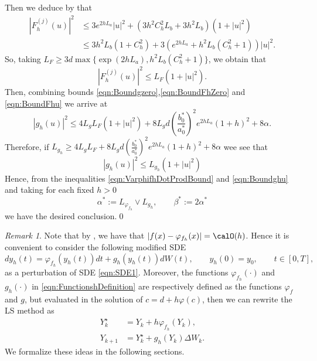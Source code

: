 \documentclass[3p]{elsarticle}
\theoremstyle{definition}
\theoremstyle{plain}%
\theoremstyle{remark}
\newtheorem{remark}{Remark}[section]
\newcommand{\SM}{LS\xspace}
\begin{document}
\begin{pf}
\begin{dmath*}
	\end{dmath*}
	Then we deduce by  that
	\begin{align*}
		|F_h^{(j)}(u)|^2 
		&\leq
			3 e^{2h L_a }|u|^2 + (3 h^2 C_h^2 L_b + 3h^ 2L_b) (1+|u|^2) \\
		&\leq
			3 h^2 L_b (1 + C_h^2)   +
			3 \left(
				 e^{2 h L_a} + h^2 L_b (C_h^2 + 1 ) 
			\right)|u|^2.	
	\end{align*}
	So, taking 
	$
		L_F\geq 3 d \max\{ \exp(2h L_a),  h^2 L_b(C_h^2+1)\}
	$,
	we obtain that
	\begin{equation}\label{eqn:BoundFhu}
		|F_h^{(j)}(u)|^2
		\leq
			L_F(1+|u|^2).	
	\end{equation}
	Then, combining bounds \eqref{eqn:Boundgzero},\eqref{eqn:BoundFhZero} and \eqref{eqn:BoundFhu} we arrive at
	\begin{equation*}
		|g_h(u)|^2 \leq
			4 L_g L_F(1+|u|^2)
			+ 8 L_g d
			\left(
				\frac{b_0^*}{a_0^*}
			\right)^2
			e^{2h L_a} (1+h)^2
			+8 \alpha.
	\end{equation*}
	Therefore, if
	$
		 L_{g_h} 
		 \geq 
			  4 L_g L_F + 8 L_g d
			  \left(
				  \frac{b_0^*}{a_0^*}
			  \right)^2
			  e^{2h L_a} (1+h)^2
			  +8 \alpha		  
	$
	wee see that
	\begin{equation}\label{eqn:Boundghu}
		|g_h(u)|^2
		\leq
			L_{g_h}(1+|u|^2)		
	\end{equation}
	Hence, from the inequalities \eqref{eqn:VarphifhDotProdBound} and \eqref{eqn:Boundghu} and taking
	for each fixed $h>0$
	$$
		\alpha^* := L_{\varphi_{f_h}}\vee L_{g_h}, \qquad
		\beta^* := 2\alpha^*
	$$ 
	 we have the desired conclusion.\qed
\end{pf}
%
\begin{remark}\label{rmk:PertrubedSDE}
	Note that by , we have that $|f(x)-\varphi_{f_h}(x)|=\calO(h)$.
	Hence it is convenient to  consider the following modified SDE
	\begin{equation*} %
		dy_h(t)= \varphi_{f_h}(y_h(t))dt +g_h(y_h(t))dW(t),
		\qquad y_h(0)=y_0,  \qquad t\in [0,T],
	\end{equation*}
	as a perturbation of SDE \eqref{eqn:SDE1}. 
	Moreover, the functions $\varphi_{f_h}(\cdot)$ and $g_h(\cdot)$ in \eqref{eqn:FunctionshDefinition} are
	respectively defined as the functions $\varphi_{f}$ and $g$, but  evaluated in the solution of $c=d + h\varphi(c)$, 
	then we can rewrite the \SM method  as
	\begin{align*}
		Y_k^{\star} &= Y_k + h \varphi_{f_h}(Y_k),\\
		Y_{k+1} &= Y_k^{\star} + g_h(Y_k)\Delta W_k.
	\end{align*}
	We formalize these ideas in the following sections.
\end{remark}
\end{document}
